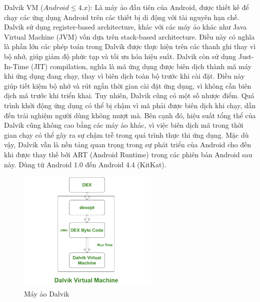 \begin{flushleft}
  \hspace*{0.8cm}Dalvik VM ($Android \leq 4.x$): Là máy ảo đầu tiên của Android,  được thiết kế để chạy các ứng dụng Android trên các thiết bị di động với tài nguyên hạn chế. Dalvik sử dụng register-based architecture, khác với các máy ảo khác như Java Virtual Machine (JVM) vốn dựa trên stack-based architecture. Điều này có nghĩa là phần lớn các phép toán trong Dalvik được thực hiện trên các thanh ghi thay vì bộ nhớ, giúp giảm độ phức tạp và tối ưu hóa hiệu suất. Dalvik còn sử dụng Just-In-Time (JIT) compilation, nghĩa là mã ứng dụng được biên dịch thành mã máy khi ứng dụng đang chạy, thay vì biên dịch toàn bộ trước khi cài đặt. Điều này giúp tiết kiệm bộ nhớ và rút ngắn thời gian cài đặt ứng dụng, vì không cần biên dịch mã trước khi triển khai. Tuy nhiên, Dalvik cũng có một số nhược điểm. Quá trình khởi động ứng dụng có thể bị chậm vì mã phải được biên dịch khi chạy, dẫn đến trải nghiệm người dùng không mượt mà. Bên cạnh đó, hiệu suất tổng thể của Dalvik cũng không cao bằng các máy ảo khác, vì việc biên dịch mã trong thời gian chạy có thể gây ra sự chậm trễ trong quá trình thực thi ứng dụng. Mặc dù vậy, Dalvik vẫn là nền tảng quan trọng trong sự phát triển của Android cho đến khi được thay thế bởi ART (Android Runtime) trong các phiên bản Android sau này.
  Dùng từ Android 1.0 đến Android 4.4 (KitKat).
  \begin{figure}[H] 
    \centering
    \includegraphics[width=0.6\textwidth]{images/DalvikVM.png}
    \caption{Máy ảo Dalvik}
    \label{fig:android}
\end{figure}  
\end{flushleft}

